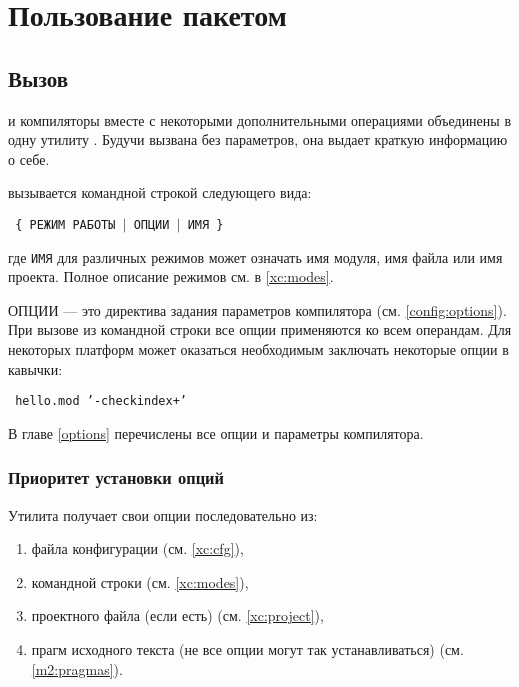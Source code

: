 
\chapter{Пользование пакетом \XDS}\label{usage}

\section{Вызов \XDS}

\xds{}  \mt{} и \ot{} компиляторы вместе с некоторыми дополнительными
операциями объединены в одну утилиту \xc. 
Будучи вызвана без параметров, она выдает краткую информацию о себе.

\xc{} вызывается командной строкой следующего вида:
\begin{flushleft} \tt
\xc{} \{ РЕЖИМ РАБОТЫ $|$ ОПЦИИ $|$ ИМЯ \}
\end{flushleft}
где {\tt ИМЯ} для различных режимов может означать
имя модуля, имя файла или имя проекта.
Полное описание режимов см. в \ref{xc:modes}.

ОПЦИИ --- это директива задания параметров компилятора 
(см. \ref{config:options}).
При вызове из командной строки все опции применяются ко всем операндам.
Для некоторых платформ может оказаться необходимым заключать некоторые 
опции в кавычки:
\begin{flushleft} \tt
    \xc{} hello.mod '-checkindex+'
\end{flushleft}
В главе \ref{options} перечислены все опции и параметры компилятора.

\subsection{Приоритет установки опций}\label{precedence}

Утилита \xc{} получает свои опции последовательно из:
\begin{enumerate}
\item         файла конфигурации {\bf \cfg} (см. \ref{xc:cfg}),
\item         командной строки (см. \ref{xc:modes}),
\item         проектного файла (если есть) (см. \ref{xc:project}),
\item         прагм исходного текста (не все опции могут так устанавливаться)
              (см. \ref{m2:pragmas}).
\end{enumerate}

